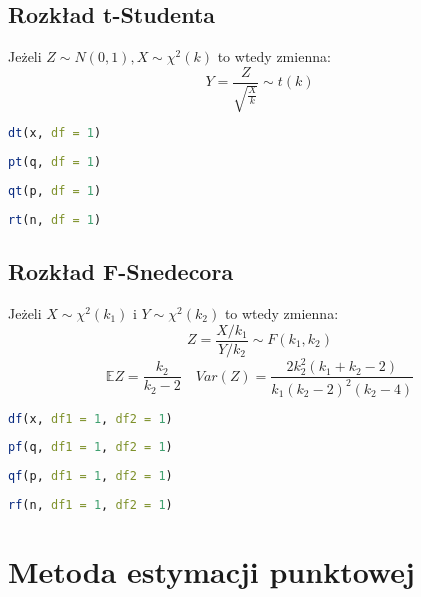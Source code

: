 \documentclass{../notatki}
\begin{document}
\subsection{Rozkład t-Studenta}

Jeżeli $Z \sim N(0,1), X \sim \chi^2(k)$ to wtedy zmienna:
$$
Y = \frac{Z}{\sqrt{\frac{X}{k}}} \sim t(k)
$$

\begin{lstlisting}[language=R, caption=gęstość w punkcie x]
dt(x, df = 1)
\end{lstlisting}
\begin{lstlisting}[language=R, caption=dystrybuanta]
pt(q, df = 1)
\end{lstlisting}
\begin{lstlisting}[language=R, caption=kwantyl p-tego percentyla]
qt(p, df = 1)
\end{lstlisting}
\begin{lstlisting}[language=R, caption=n losowych zmiennych z rozkładu t-Studenta]
rt(n, df = 1)
\end{lstlisting}

\subsection{Rozkład F-Snedecora}

Jeżeli $X \sim \chi^2(k_1)$ i $Y \sim \chi^2(k_2)$ to wtedy zmienna:
$$
Z = \frac{X/k_1}{Y/k_2} \sim F(k_1, k_2)
$$
$$
\mathbb{E} Z = \frac{k_2}{k_2 - 2} \quad Var(Z) = \frac{2k_2^2(k_1 +
k_2 - 2)}{k_1(k_2 - 2)^2(k_2 - 4)}
$$

\begin{lstlisting}[language=R, caption=gęstość w punkcie x]
df(x, df1 = 1, df2 = 1)
\end{lstlisting}
\begin{lstlisting}[language=R, caption=dystrybuanta]
pf(q, df1 = 1, df2 = 1)
\end{lstlisting}
\begin{lstlisting}[language=R, caption=kwantyl p-tego percentyla]
qf(p, df1 = 1, df2 = 1)
\end{lstlisting}
\begin{lstlisting}[language=R, caption=n losowych zmiennych z rozkładu F]
rf(n, df1 = 1, df2 = 1)
\end{lstlisting}

\section{Metoda estymacji punktowej}
\end{document}
